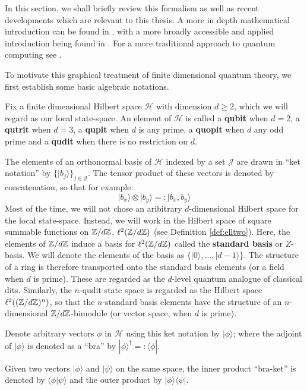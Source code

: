 In this section, we shall briefly review this formalism as well as recent developments which are relevant to this thesis.  A more in depth mathematical introduction can be found in \cite{heunen}, with a more broadly accessible and applied introduction being found in \cite{pqp}.  For a more traditional approach to quantum computing see \cite{nielsen}.


To motivate this graphical treatment of finite dimensional quantum theory, we first establish some basic algebraic notations.


Fix a finite dimensional Hilbert space $\mathcal H$ with dimension $d\geq 2$, which we will regard as our local state-space. An element of  $\mathcal H$ is called a {\bf qubit} when $d=2$, a {\bf qutrit} when $d=3$, a {\bf qupit} when $d$ is any prime, a {\bf quopit} when $d$ any odd prime and  a {\bf qudit} when there is no restriction on $d$.

The elements of an orthonormal basis of $\mathcal H$ indexed by a set $\mathcal J$ are drawn in ``ket notation'' by $\{|b_{j}\rangle \}_{j \in \mathcal J}$.
The tensor product of these vectors is denoted by concatenation, so that for example:
$$
| b_x \rangle \otimes | b_y\rangle =: |b_x,b_y \rangle  
$$
Most of the time,  we will not chose an aribitrary $d$-dimensional Hilbert space for the local state-space.  Instead, we will work in the Hilbert space of square summable functions on $\mathbb{Z}/d\mathbb{Z}$, $\ell^2(\mathbb{Z}/d\mathbb{Z})$ (see Definition \ref{def:elltwo}).  Here, the elements of $\mathbb{Z}/d\mathbb{Z}$ induce a basis for  $\ell^2(\mathbb{Z}/d\mathbb{Z})$ called the {\bf standard basis} or $Z$-basis.  We will denote the elements of the basis  as  $\{| 0\rangle , \ldots, |d-1\rangle \}$.  The structure of a ring is therefore transported onto the standard basis elements (or a field when $d$ is prime).  These are regarded as the $d$-level quantum analogue of classical dits.    Similarly, the $n$-qudit state space is regarded as the Hilbert space $\ell^2((\mathbb{Z}/d\mathbb{Z})^n)$, so that the $n$-standard basis elements have the structure of an $n$-dimensional $\mathbb{Z}/d\mathbb{Z}$-bimodule (or vector space, when $d$ is prime).

Denote arbitrary vectors $\phi$ in $\mathcal H$ using this ket notation by $|\phi \rangle$; where the adjoint of $|\phi \rangle$ is denoted as a ``bra''  by $|\phi \rangle^\dag =: \langle \phi |$. 

Given two vectors $|\phi \rangle$ and $| \psi \rangle$ on the same space, the inner product ``bra-ket'' is denoted by $\langle \phi | \psi \rangle$ and the outer product by $|\phi \rangle\langle \psi|$. 


